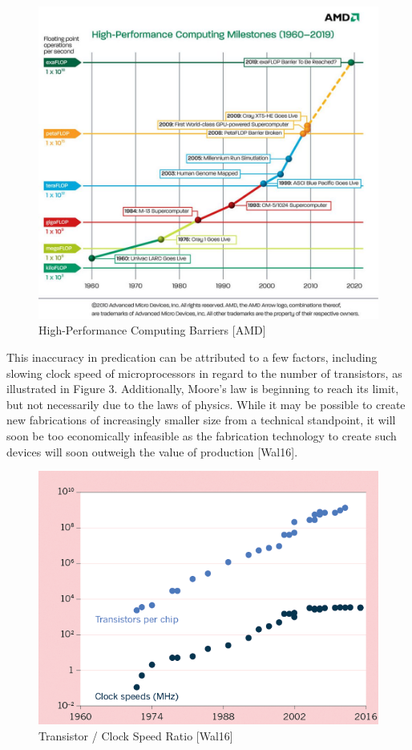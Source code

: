 \documentclass[12pt, letterpaper]{article}
\begin{document}
\begin{figure}[H]
	\includegraphics[width=\linewidth]{milestones.jpg}
	\caption{High-Performance Computing Barriers [AMD]}
\end{figure}

This inaccuracy in predication can be attributed to a few factors, including slowing clock speed of microprocessors in regard to the number of transistors, as illustrated in Figure 3. Additionally, Moore’s law is beginning to reach its limit, but not necessarily due to the laws of physics. While it may be possible to create new fabrications of increasingly smaller size from a technical standpoint, it will soon be too economically infeasible as the fabrication technology to create such devices will soon outweigh the value of production [Wal16].

\begin{figure}[H]
	\includegraphics[width=\linewidth]{moore.png}
	\caption{Transistor / Clock Speed Ratio [Wal16]}
\end{figure}
\end{document}
